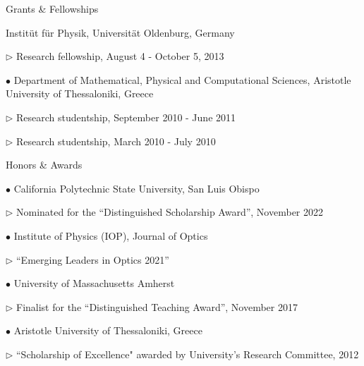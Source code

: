 \documentclass[10pt]{article} %
\newenvironment{outerlist}[1][\enskip\textbullet]%
        {\begin{itemize}[#1]}{\end{itemize}%
         \vspace{-.6\baselineskip}}
\newenvironment{innerlist}[1][\enskip\textbullet]%
        {\begin{compactitem}[#1]}{\end{compactitem}}
\begin{document}
\begin{section}{Grants \& Fellowships}
\begin{outerlist}
Instit\"ut f\"ur Physik, Universit\"at Oldenburg, Germany
\begin{innerlist}
\item[$\triangleright$] Research fellowship, August 4 - October 5, 2013
\end{innerlist}
\item[$\bullet$] Department of Mathematical, Physical and Computational 
Sciences, Aristotle University of Thessaloniki, Greece
\begin{innerlist}
\item [$\triangleright$] Research studentship, September 2010 - June 2011
\item [$\triangleright$] Research studentship, March 2010 - July 2010
\end{innerlist}

\end{outerlist}

\end{section}

\begin{section}{Honors \& Awards}
\begin{outerlist}

\item[$\bullet$] \vskip -7mm
California Polytechnic State University, San Luis Obispo
\begin{innerlist}
\item[$\triangleright$] Nominated for the ``Distinguished Scholarship Award'', November 2022
\end{innerlist}
\item[$\bullet$]
Institute of Physics (IOP), Journal of Optics
\begin{innerlist}
\item[$\triangleright$] ``Emerging Leaders in Optics 2021''
\end{innerlist}
\item[$\bullet$] 
University of Massachusetts Amherst
\begin{innerlist}
\item[$\triangleright$] Finalist for the ``Distinguished Teaching Award'', November 2017
\end{innerlist}
\item[$\bullet$] Aristotle University of Thessaloniki, Greece
\begin{innerlist}
\item[$\triangleright$] ``Scholarship of Excellence" awarded by University's Research Committee, 2012
\end{innerlist}

\end{outerlist}

\end{section}
\end{document}
